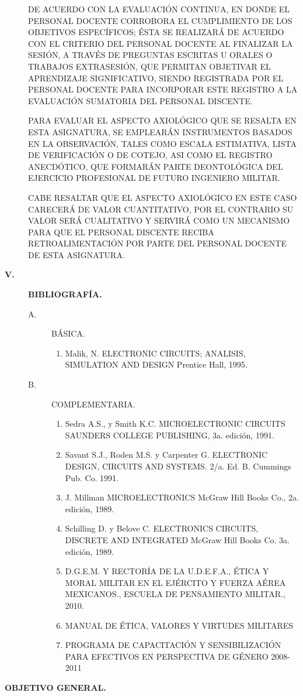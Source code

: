 \documentclass{myarticle}
\begin{document}
\begin{description}
DE ACUERDO CON LA EVALUACIÓN CONTINUA, EN DONDE EL PERSONAL DOCENTE 
CORROBORA EL CUMPLIMIENTO DE LOS OBJETIVOS ESPECÍFICOS; ÉSTA SE REALIZARÁ 
DE ACUERDO CON EL CRITERIO DEL PERSONAL DOCENTE AL FINALIZAR LA SESIÓN, 
A TRAVÉS DE PREGUNTAS ESCRITAS U ORALES O TRABAJOS EXTRASESIÓN, QUE PERMITAN 
OBJETIVAR EL APRENDIZAJE SIGNIFICATIVO, SIENDO REGISTRADA POR EL PERSONAL 
DOCENTE PARA INCORPORAR ESTE REGISTRO A LA EVALUACIÓN SUMATORIA DEL PERSONAL 
DISCENTE.


PARA EVALUAR EL ASPECTO AXIOLÓGICO QUE SE RESALTA EN ESTA ASIGNATURA, SE 
EMPLEARÁN INSTRUMENTOS BASADOS EN LA OBSERVACIÓN, TALES COMO ESCALA 
ESTIMATIVA, LISTA DE VERIFICACIÓN O DE COTEJO, ASI COMO EL REGISTRO 
ANECDÓTICO, QUE FORMARÁN PARTE DEONTOLÓGICA DEL EJERCICIO PROFESIONAL DE 
FUTURO INGENIERO MILITAR.

CABE RESALTAR QUE EL ASPECTO AXIOLÓGICO EN ESTE CASO CARECERÁ DE VALOR 
CUANTITATIVO, POR EL CONTRARIO SU VALOR SERÁ CUALITATIVO Y SERVIRÁ COMO 
UN ME\-CA\-NIS\-MO PARA QUE EL PERSONAL DISCENTE RECIBA RETROALIMENTACIÓN POR 
PARTE DEL PERSONAL DOCENTE DE ESTA ASIGNATURA.
\item[{\large{\bf V.}}] {\large{\bf BIBLIOGRAFÍA.}}
\begin{description}
\item[A.] BÁSICA.
\begin{enumerate}
\item Malik, N. ELECTRONIC CIRCUITS; ANALISIS, SIMULATION AND DESIGN 
Prentice Hall, 1995.
\end{enumerate}
\item[B.] COMPLEMENTARIA.
\begin{enumerate}
\item Sedra A.S., y Smith K.C. MICROELECTRONIC CIRCUITS SAUNDERS COLLEGE 
PUBLISHING, 3a. edición, 1991. 
\item Savant S.J., Roden M.S. y Carpenter G. ELECTRONIC DESIGN, CIRCUITS 
AND SYSTEMS. 2/a. Ed. B. Cummings Pub. Co. 1991.
\item J. Millman MICROELECTRONICS McGraw Hill Books Co., 2a. edición, 1989.
\item Schilling D. y Belove C. ELECTRONICS CIRCUITS, DISCRETE AND INTEGRATED 
McGraw Hill Books Co. 3a. edición, 1989.
\item D.G.E.M. Y RECTORÍA DE LA U.D.E.F.A., ÉTICA Y MORAL MILITAR EN EL 
EJÉRCITO Y FUERZA AÉREA MEXICANOS., ESCUELA DE PENSAMIENTO MILITAR., 2010.
\item MANUAL DE ÉTICA, VALORES Y VIRTUDES MILITARES
\item PROGRAMA DE CAPACITACIÓN Y SENSIBILIZACIÓN PARA EFECTIVOS EN 
PERSPECTIVA DE GÉNERO 2008-2011
\end{enumerate}
\end{description}
\end{description}
\eject
\begin{center}
{\bf OBJETIVO GENERAL.}
\end{center}
\end{document}

